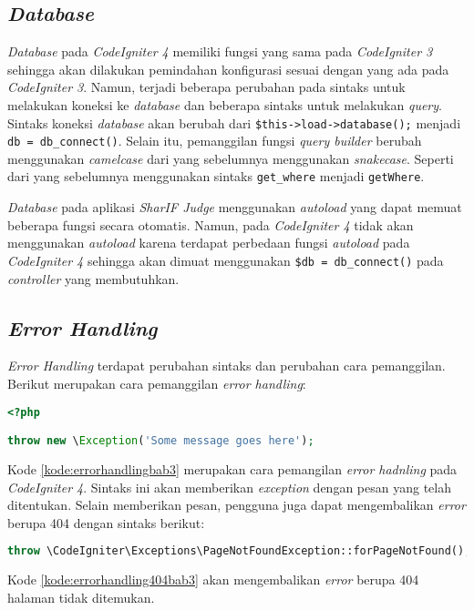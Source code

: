 \subsection{\textit{Database}}
\textit{Database} pada \textit{CodeIgniter 4} memiliki fungsi yang sama pada \textit{CodeIgniter 3} sehingga akan dilakukan pemindahan konfigurasi sesuai dengan yang ada pada \textit{CodeIgniter 3}. Namun, terjadi beberapa perubahan pada sintaks untuk melakukan koneksi ke \textit{database} dan beberapa sintaks untuk melakukan \textit{query}. Sintaks koneksi \textit{database} akan berubah dari \texttt{\$this->load->database();} menjadi \texttt{db = db\_connect()}. Selain itu, pemanggilan fungsi \textit{query builder} berubah menggunakan \textit{camelcase} dari yang sebelumnya menggunakan \textit{snakecase}. Seperti dari yang sebelumnya menggunakan sintaks \texttt{get\_where} menjadi \texttt{getWhere}.

\textit{Database} pada aplikasi \textit{SharIF Judge} menggunakan \textit{autoload} yang dapat memuat beberapa fungsi secara otomatis. Namun, pada \textit{CodeIgniter 4}  tidak akan menggunakan \textit{autoload} karena terdapat perbedaan fungsi \textit{autoload} pada \textit{CodeIgniter 4} sehingga akan dimuat menggunakan \texttt{\$db = db\_connect()} pada \textit{controller} yang membutuhkan.

\subsection{\textit{Error Handling}}
\textit{Error Handling} terdapat perubahan sintaks dan perubahan cara pemanggilan. Berikut merupakan cara pemanggilan \textit{error handling}:
\begin{lstlisting}[language=PHP, caption=Contoh pemanggilan \textit{Error Handling} pada \textit{CodeIgniter 4}, label=kode:errorhandlingbab3]
<?php

throw new \Exception('Some message goes here');
\end{lstlisting}
Kode \ref{kode:errorhandlingbab3} merupakan cara pemangilan \textit{error hadnling} pada \textit{CodeIgniter 4}. Sintaks ini akan memberikan \textit{exception} dengan pesan yang telah ditentukan. Selain memberikan pesan, pengguna juga dapat mengembalikan \textit{error} berupa 404 dengan sintaks berikut:
\begin{lstlisting}[language=PHP, caption=Contoh pemanggilan \textit{Error Handling} 404 pada \textit{CodeIgniter 4}, label=kode:errorhandling404bab3]
throw \CodeIgniter\Exceptions\PageNotFoundException::forPageNotFound();
\end{lstlisting}
Kode \ref{kode:errorhandling404bab3} akan mengembalikan \textit{error} berupa 404 halaman tidak ditemukan.


